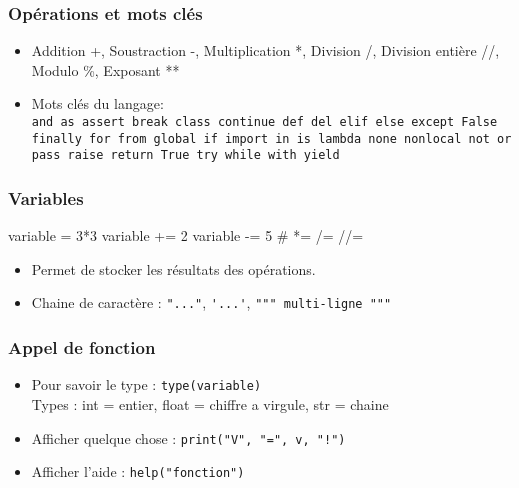 \documentclass{beamer}
\let\oldsubsubsection\subsubsection
\renewcommand{\subsubsection}[2][]{\def\currentsubsubsection{#2}\oldsubsubsection[#1]{#2}}
\begin{document}
\subsubsection{Opérations et mots clés}

\begin{frame}
   \begin{itemize}
        \item Addition +, Soustraction -, Multiplication *, Division /, Division entière //, Modulo \%, Exposant **
  
        \item Mots clés du langage:
        \\\lstinline{and as assert break class continue def del elif else except False finally for from global if import in is lambda none nonlocal not or pass raise return True try while with yield}
    \end{itemize}
\end{frame}

\subsubsection{Variables}

\begin{code}{\codebox}
variable = 3*3
variable += 2
variable -= 5
#  *=  /=  //=  %
\end{code}
\begin{frame}
   \begin{itemize}
        \item Permet de stocker les résultats des opérations.\\
        \usebox\codebox
  
        \item Chaine de caractère : \lstinline{"..."}, \lstinline{'...'}, \lstinline{""" multi-ligne """}
    \end{itemize}
\end{frame}

\subsubsection{Appel de fonction}

\begin{frame}
   \begin{itemize}
        \item Pour savoir le type : \lstinline{type(variable)}\\
        Types : int = entier, float = chiffre a virgule, str = chaine
  
        \item Afficher quelque chose : \lstinline{print("V", "=", v, "!")}
  
        \item Afficher l'aide : \lstinline{help("fonction")}
    \end{itemize}
\end{frame}
\end{document}
